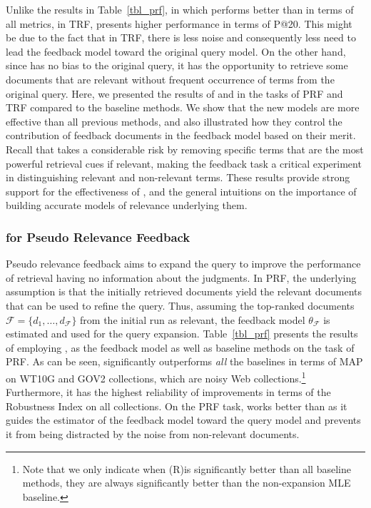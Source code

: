 Unlike the results in Table~\ref{tbl_prf}, in which \acrswlm performs better than \acswlm in terms of all metrics, in TRF, \acswlm presents higher performance in terms of P@20. This might be due to the fact that in TRF, there is less noise and consequently less need to lead the feedback model toward the original query model. On the other hand, since \acrswlm has no bias to the original query, it has the opportunity to retrieve some documents that are relevant without frequent occurrence of terms from the original query.
\medskip
Here, we presented the results of \acswlm  and \acrswlm  in the tasks of PRF and TRF compared to the baseline methods.
We show that the new models are more effective than all previous methods, and also illustrated how they control the contribution of feedback documents in the feedback model based on their merit.
Recall that \acswlm takes a considerable risk by removing specific terms that are the most powerful retrieval cues if relevant, making the feedback task a critical experiment in distinguishing relevant and non-relevant terms. 
%
These results provide strong support for the effectiveness of \swlms, and the general intuitions on the importance of building accurate models of relevance underlying them.



\subsubsection{\acswlm for Pseudo Relevance Feedback}
\label{sec:PRF}
Pseudo relevance feedback aims to expand the query to improve the performance of retrieval having no information about the judgments. In PRF, the underlying assumption is that the initially retrieved documents yield the relevant documents that can be used to refine the query. Thus, assuming the top-ranked documents $\mathcal{F} = \{d_1, \ldots ,d_{\mathcal{F}}\}$ from the initial run as relevant, the feedback model $\theta_{\mathcal{F}}$ is estimated and used for the query expansion.  
Table~\ref{tbl_prf} presents the results of employing \swlms, \rswlms as the feedback model as well as baseline methods on the task of PRF\@. 
As can be seen, \acrswlm significantly outperforms \emph{all} the baselines in terms of MAP on WT10G and GOV2 collections, which are noisy Web collections.\footnote{Note that we only indicate when (R)\acswlm is significantly better than all baseline methods, they are always significantly better than the non-expansion MLE baseline.} Furthermore, it has the highest reliability of improvements in terms of the Robustness Index on all collections.
On the PRF task, \acrswlm works better than \acswlm as it guides the estimator of the feedback model toward the query model and prevents it from being distracted by the noise from non-relevant documents.

